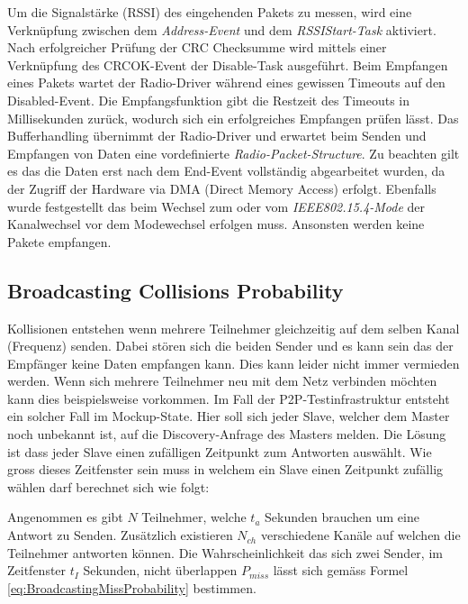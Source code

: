 Um die Signalstärke (RSSI) des eingehenden Pakets zu messen, wird eine Verknüpfung zwischen dem \textit{Address-Event} und dem \textit{RSSIStart-Task} aktiviert.
Nach erfolgreicher Prüfung der CRC Checksumme wird mittels einer Verknüpfung des CRCOK-Event der Disable-Task ausgeführt.
Beim Empfangen eines Pakets wartet der Radio-Driver während eines gewissen Timeouts auf den Disabled-Event.
Die Empfangsfunktion gibt die Restzeit des Timeouts in Millisekunden zurück, wodurch sich ein erfolgreiches Empfangen prüfen lässt.
Das Bufferhandling übernimmt der Radio-Driver und erwartet beim Senden und Empfangen von Daten eine vordefinierte \textit{Radio-Packet-Structure}.
Zu beachten gilt es das die Daten erst nach dem End-Event  vollständig abgearbeitet wurden, da der Zugriff der Hardware via DMA (Direct Memory Access) erfolgt.
Ebenfalls wurde festgestellt das beim Wechsel zum oder vom  \textit{IEEE802.15.4-Mode} der Kanalwechsel vor dem Modewechsel erfolgen muss. Ansonsten werden keine Pakete empfangen. \cite{nordic_semi_nrf_infocenter_radio_receive_sequence_2020}


\subsection{Broadcasting Collisions Probability}\label{sec:BroadcastingCollissionsProbability}

Kollisionen entstehen wenn mehrere Teilnehmer gleichzeitig auf dem selben Kanal (Frequenz) senden.
Dabei stören sich die beiden Sender und es kann sein das der Empfänger keine Daten empfangen kann.
Dies kann leider nicht immer vermieden werden. Wenn sich mehrere Teilnehmer neu mit dem Netz verbinden möchten kann dies beispielsweise vorkommen.
Im Fall der P2P-Testinfrastruktur entsteht ein solcher Fall im Mockup-State.
Hier soll sich jeder Slave, welcher dem Master noch unbekannt ist, auf die Discovery-Anfrage des Masters melden.
Die Lösung ist dass jeder Slave einen zufälligen Zeitpunkt zum Antworten auswählt.
Wie gross dieses Zeitfenster sein muss in welchem ein Slave einen Zeitpunkt zufällig wählen darf berechnet sich wie folgt:

Angenommen es gibt $N$ Teilnehmer, welche $t_a$ Sekunden brauchen um eine Antwort zu Senden.
Zusätzlich existieren $N_{ch}$ verschiedene Kanäle auf welchen die Teilnehmer antworten können.
Die Wahrscheinlichkeit das sich zwei Sender, im Zeitfenster $t_I$ Sekunden, nicht überlappen $P_{miss}$ lässt sich gemäss Formel \ref{eq:BroadcastingMissProbability} bestimmen. \cite{rk_how_to_deal_with_broadcasting_collision_2020}

